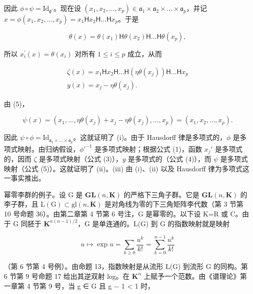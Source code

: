 因此 \(\phi \circ \psi = \mathrm{Id}_{\mathfrak{g}'}\)。现在设 \((x_{1}, x_{2}, \ldots, x_{p}) \in \mathfrak{a}_{1} \times \mathfrak{a}_{2} \times \dots \times \mathfrak{a}_{p}\)，并记 \(x = \phi(x_{1}, x_{2}, \ldots, x_{p}) = x_{1} \mathsf{H} x_{2} \mathsf{H} \dots \mathsf{H} x_{p}\)。于是

\[
\theta (x) = \theta (x _ {1}) \mathsf {H} \theta (x _ {2}) \mathsf {H} \dots \mathsf {H} \theta (x _ {p}),
\]

所以 \(x_{i}^{\prime}(x) = \theta (x_{i})\) 对所有 \(1\leqslant i\leqslant p\) 成立，从而

\[
\begin{array}{c} \zeta (x) = x _ {1} \mathsf {H} x _ {2} \mathsf {H} \dots \mathsf {H} (\eta \theta (x _ {j})) \mathsf {H} \dots \mathsf {H} x _ {p} \\ y (x) = x _ {j} - \eta \theta (x _ {j}). \end{array}
\]

由 (5)，

\[
\psi (x) = \left(x _ {1}, \dots , \eta \theta \left(x _ {j}\right) + x _ {j} - \eta \theta \left(x _ {j}\right), \dots , x _ {p}\right) = \left(x _ {1}, x _ {2}, \dots , x _ {p}\right).
\]

因此 \(\psi \circ \phi = \mathrm{Id}_{\mathfrak{a}_1 \times \ldots \times \mathfrak{a}_p}\)。这就证明了 (i)。由于 Hausdorff 律是多项式的，\(\phi\) 是多项式映射。由归纳假设，\(\phi'^{-1}\) 是多项式映射；根据公式 (1)，函数 \(x_j'\) 是多项式的，因而 \(\zeta\) 是多项式映射（公式 (3)），\(y\) 是多项式的（公式 (4)），而 \(\psi\) 是多项式映射（公式 (5)）。这就证明了 (ii)。(iii) 由 (i)、(ii) 以及 Hausdorff 律为多项式这一事实推出。

幂零李群的例子。设 G 是 \(\mathbf{GL}(n,\mathbf{K})\) 的严格下三角子群。它是 \(\mathbf{GL}(n,\mathbf{K})\) 的李子群，且 \(\mathrm{L}(\mathrm{G})\subset\mathrm{gl}(n,\mathbf{K})\) 是对角线为零的下三角矩阵李代数（第 3 节第 10 号命题 36）。由第二章第 4 节第 6 号注，G 是幂零的。以下设 K=R 或 C。由于 G 同胚于 \(\mathbf{K}^{n(n-1)/2}\)，G 是单连通的。L(G) 到 G 的指数映射就是映射

\[
u \mapsto \exp u = \sum_ {k \geqslant 0} \frac {u ^ {k}}{k !} = \sum_ {k = 0} ^ {n - 1} \frac {u ^ {k}}{k !}
\]

（第 6 节第 4 号例）。由命题 13，指数映射是从流形 L(G) 到流形 G 的同构。第 6 节第 9 号命题 17 给出其逆双射 log。在 \(\mathbf{K}^{n}\) 上赋予一个范数。由《谱理论》第一章第 4 节第 9 号，当 g ∈ G 且 \textbar\textbar g − 1\textbar\textbar{} \textless{} 1 时，

